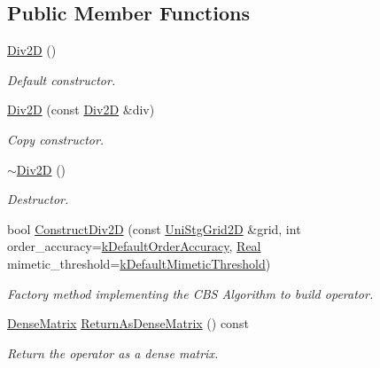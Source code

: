 \subsection*{Public Member Functions}
\begin{DoxyCompactItemize}
\item 
\hyperlink{classmtk_1_1Div2D_a124b888d5889538977e1a47d2fec78ff}{Div2\+D} ()
\begin{DoxyCompactList}\small\item\em Default constructor. \end{DoxyCompactList}\item 
\hyperlink{classmtk_1_1Div2D_a0f5214b5099f17940d6643f39c53332e}{Div2\+D} (const \hyperlink{classmtk_1_1Div2D}{Div2\+D} \&div)
\begin{DoxyCompactList}\small\item\em Copy constructor. \end{DoxyCompactList}\item 
\hyperlink{classmtk_1_1Div2D_a5c10c0d7b974841e923ebe3fda67c468}{$\sim$\+Div2\+D} ()
\begin{DoxyCompactList}\small\item\em Destructor. \end{DoxyCompactList}\item 
bool \hyperlink{classmtk_1_1Div2D_a4214055909a6b94fcb9d657cc839055f}{Construct\+Div2\+D} (const \hyperlink{classmtk_1_1UniStgGrid2D}{Uni\+Stg\+Grid2\+D} \&grid, int order\+\_\+accuracy=\hyperlink{group__c01-roots_ga0d95560098eb36420511103637b6952f}{k\+Default\+Order\+Accuracy}, \hyperlink{group__c01-roots_gac080bbbf5cbb5502c9f00405f894857d}{Real} mimetic\+\_\+threshold=\hyperlink{group__c01-roots_ga35718d949bdc81a08a9cc8ebbe3478a2}{k\+Default\+Mimetic\+Threshold})
\begin{DoxyCompactList}\small\item\em Factory method implementing the C\+B\+S Algorithm to build operator. \end{DoxyCompactList}\item 
\hyperlink{classmtk_1_1DenseMatrix}{Dense\+Matrix} \hyperlink{classmtk_1_1Div2D_ae4f880fb28ad2379906e9ac0dfaa4458}{Return\+As\+Dense\+Matrix} () const 
\begin{DoxyCompactList}\small\item\em Return the operator as a dense matrix. \end{DoxyCompactList}\end{DoxyCompactItemize}
